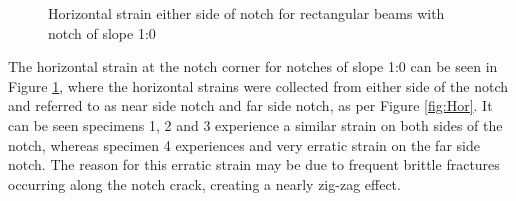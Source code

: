 \documentclass[11pt,a4paper]{article}
\numberwithin{equation}{subsection}
\begin{document}
\begin{figure}[h]
	\begin{center}
	\end{center}
	\caption{Horizontal strain either side of notch for rectangular beams with notch of slope 1:0}
	\label{fig:Rect_10_Z}
\end{figure}
\pagebreak

\noindent
The horizontal strain at the notch corner for notches of slope 1:0 can be seen in Figure \ref{fig:Rect_10_Z}, where the horizontal strains were collected from either side of the notch and referred to as near side notch and far side notch, as per Figure \ref{fig:Hor}. It can be seen specimens 1, 2 and 3 experience a similar strain on both sides of the notch, whereas specimen 4 experiences and very erratic strain on the far side notch. The reason for this erratic strain may be due to frequent brittle fractures occurring along the notch crack, creating a nearly zig-zag effect.
\end{document}
